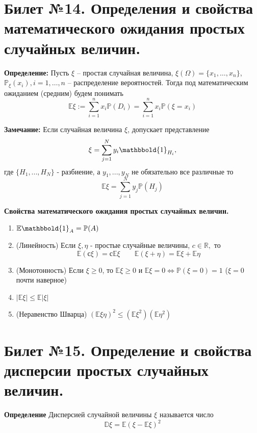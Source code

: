 	\section{Билет №14. Определения и свойства математического ожидания простых случайных величин.}
	\hspace{\parindent}\textbf{Определение:}
	Пусть $\xi$ -- простая случайная величина, $\xi(\Omega) = \{x_1, \ldots, x_n\}$, $\mathbb{P}_{\xi}(x_i), i = 1, \ldots, n$ -- распределение вероятностей. Тогда под математическим ожиданием (средним) будем понимать
	\[
	\mathbb{E}\xi := \sum\limits_{i = 1}^n x_i \mathbb{P} (D_i) = \sum\limits_{i = 1}^n x_i \mathbb{P} (\xi = x_i)
	\]
	
	\textbf{Замечание:}
	Если случайная величина $\xi$, допускает представление 
	\[
	\xi = \sum\limits_{j = 1}^N y_i \mathbbold{1}_{H_i},
	\]
	где $ \{ H_1, ..., H_N\}$ - разбиение, а $y_1, ..., y_N$ не обязательно все различные то 
	\[
	\mathbb{E}\xi = \sum\limits_{j = 1}^N y_j \mathbb{P}(H_j)
	\]
	
	\textbf{Свойства математического ожидания простых случайных величин.}
	\begin{enumerate}
	    \item $\mathbb{E} \mathbbold{1}_A = \mathbb{P}(A)$
	    \item (Линейность) Если $\xi, \eta$ - простые случайные величины, $c \in \mathbb{R},$ то 
	 \[\mathbb{E}(с\xi) = с\mathbb{E} \xi \hspace{2em} \mathbb{E} (\xi + \eta) = \mathbb{E} \xi + \mathbb{E} \eta\]
	    \item (Монотонность) Если $\xi \geqslant 0$, то $\mathbb{E} \xi \geqslant 0$ и $\mathbb{E}\xi = 0 \Leftrightarrow \mathbb{P}(\xi = 0) = 1$ ($\xi = 0$ почти наверное)
	    \item $|\mathbb{E}\xi| \leqslant \mathbb{E}|\xi|$ 
	    \item (Неравенство Шварца) $(\mathbb{E} \xi \eta)^2 \leqslant (\mathbb{E} \xi^2) (\mathbb{E} \eta^2)$
	\end{enumerate}
	
	\section{Билет №15. Определение и свойства дисперсии простых случайных величин.}
	\hspace{\parindent}\textbf{Определение} Дисперсией случайной величины $\xi$ называется число \\
	\[
	\mathbb{D} \xi = \mathbb{E} (\xi - \mathbb{E} \xi)^2
	\]
	

